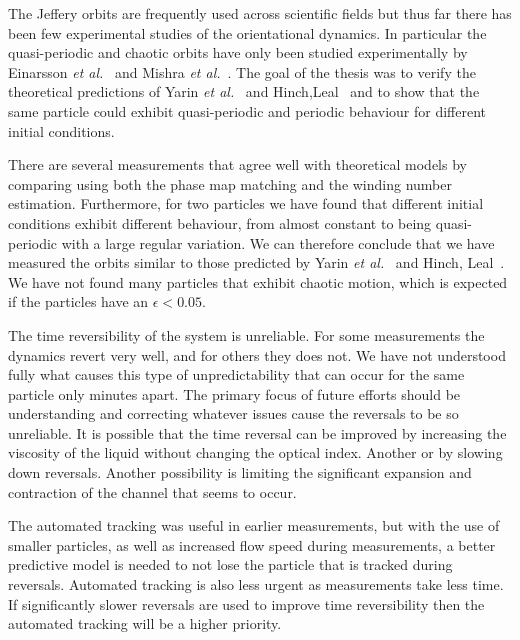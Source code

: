 The Jeffery orbits are frequently used across scientific fields but thus far there has been few experimental studies 
of the orientational dynamics. In particular the quasi-periodic and chaotic orbits have only been studied experimentally
by Einarsson \emph{et al.}~\cite{JonasExperiment} and Mishra \emph{et al.}~\cite{Mishra}.
The goal of the thesis was to verify the theoretical predictions of Yarin \emph{et al.}~\cite{Yarin} and Hinch,Leal~\cite{Leal} and to show that the same particle could exhibit quasi-periodic and periodic behaviour for different initial conditions.


There are several measurements that agree well with theoretical models by comparing using both the phase map matching and the winding number estimation. Furthermore, for two particles we have found that different initial conditions exhibit different behaviour, 
from almost constant to being quasi-periodic with a large regular variation. We can therefore conclude that we have measured the
orbits similar to those predicted by Yarin \emph{et al.}~\cite{Yarin} and Hinch, Leal~\cite{Leal}. We have not found many particles that exhibit chaotic motion, which is expected if the particles have an $\epsilon < 0.05$.

The time reversibility of the system is unreliable. For some measurements the dynamics revert very well, and for others they does not. 
We have not understood fully what causes this type of unpredictability that can occur for the same particle only 
minutes apart. The primary focus of future efforts should be understanding and correcting whatever issues cause the 
reversals to be so unreliable. It is possible that the time reversal can be improved by increasing the viscosity of the liquid
without changing the optical index. Another or by slowing down reversals. Another possibility is limiting the 
significant expansion and contraction of the channel that seems to occur.

The automated tracking was useful in earlier measurements, but with the use of smaller particles, as well as increased flow speed during measurements, 
a better predictive model is needed to not lose the particle that is tracked during reversals. Automated tracking is also less urgent as
measurements take less time. If significantly slower reversals are used to improve time reversibility then the automated tracking will be a higher priority.